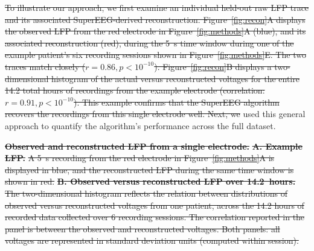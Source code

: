 \documentclass[11pt]{article}
\providecommand{\DIFaddtex}[1]{{\protect\color{blue}\uwave{#1}}} %
\providecommand{\DIFdeltex}[1]{{\protect\color{red}\sout{#1}}}                      %
\providecommand{\DIFaddbegin}{} %
\providecommand{\DIFaddend}{} %
\providecommand{\DIFdelbegin}{} %
\providecommand{\DIFdelend}{} %
\providecommand{\DIFdelFL}[1]{\DIFdel{#1}} %
\providecommand{\DIFadd}[1]{\texorpdfstring{\DIFaddtex{#1}}{#1}} %
\providecommand{\DIFdel}[1]{\texorpdfstring{\DIFdeltex{#1}}{}} %
\newcommand{\DIFscaledelfig}{0.5}
\newlength{\DIFdelgraphicswidth} %
\newlength{\DIFdelgraphicsheight} %
\newcommand{\DIFaddincludegraphics}[2][]{{\color{blue}\fbox{\DIFOincludegraphics[#1]{#2}}}} %
\newcommand{\DIFdelincludegraphics}[2][]{%
\sbox{\DIFdelgraphicsbox}{\DIFOincludegraphics[#1]{#2}}%
\settoboxwidth{\DIFdelgraphicswidth}{\DIFdelgraphicsbox} %
\settoboxtotalheight{\DIFdelgraphicsheight}{\DIFdelgraphicsbox} %
\scalebox{\DIFscaledelfig}{%
\parbox[b]{\DIFdelgraphicswidth}{\usebox{\DIFdelgraphicsbox}\\[-\baselineskip] \rule{\DIFdelgraphicswidth}{0em}}\llap{\resizebox{\DIFdelgraphicswidth}{\DIFdelgraphicsheight}{%
\setlength{\unitlength}{\DIFdelgraphicswidth}%
\begin{picture}(1,1)%
\thicklines\linethickness{2pt} %
{\color[rgb]{1,0,0}\put(0,0){\framebox(1,1){}}}%
{\color[rgb]{1,0,0}\put(0,0){\line( 1,1){1}}}%
{\color[rgb]{1,0,0}\put(0,1){\line(1,-1){1}}}%
\end{picture}%
}\hspace*{3pt}}} %
} %
\DeclareRobustCommand{\DIFaddbegin}{\DIFOaddbegin \let\includegraphics\DIFaddincludegraphics} %
\DeclareRobustCommand{\DIFaddend}{\DIFOaddend \let\includegraphics\DIFOincludegraphics} %
\DeclareRobustCommand{\DIFdelbegin}{\DIFOdelbegin \let\includegraphics\DIFdelincludegraphics} %
\DeclareRobustCommand{\DIFdelend}{\DIFOaddend \let\includegraphics\DIFOincludegraphics} %
\begin{document}
\DIFdelbegin \DIFdel{To illustrate our approach, we first examine an individual held-out
raw LFP trace and its associated SuperEEG-derived reconstruction.
Figure~\ref{fig:recon}A displays the observed LFP from the red
electrode in Figure~\ref{fig:methods}A (blue), and its associated
reconstruction (red), during the 5~s time window during one of the
example patient's six recording sessions shown in
Figure~\ref{fig:methods}E.  The two traces match closely
($r = 0.86, p < 10^{-10}$).  Figure~\ref{fig:recon}B displays a
two-dimensional histogram of the actual versus reconstructed voltages
for the entire 14.2 total hours of recordings from the example
electrode (correlation: $r = 0.91, p < 10^{-10}$).  This example
confirms that the SuperEEG algorithm recovers the recordings from this
single electrode well.  Next, we }\DIFdelend \DIFaddbegin \DIFadd{We }\DIFaddend used this general approach to quantify the algorithm's performance across the
full dataset. \DIFdelbegin %

{%
\textbf{\DIFdelFL{Observed and reconstructed LFP from a single
      electrode.}} %
\textbf{\DIFdelFL{A. Example LFP.}}  %
\DIFdelFL{A 5~s recording from the
    red electrode in Figure~\ref{fig:methods}A is displayed in blue,
    and the reconstructed LFP during the same time window is shown in
    red.  }\textbf{\DIFdelFL{B. Observed versus reconstructed LFP over
      14.2~hours.}}  %
\DIFdelFL{The two-dimensional histogram reflects the
    relation between distributions of observed versus reconstructed
    voltages from one patient, across the 14.2 hours of recorded data
    collected over 6 recording sessions.  The correlation reported in
    the panel is between the observed and reconstructed voltages.
    Both panels: all voltages are represented in standard deviation units
   (computed within session).}}
\end{document}
